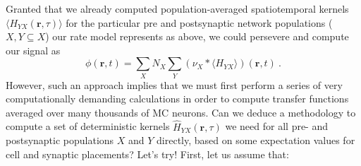 Granted that we already computed population-averaged spatiotemporal kernels $\langle H_{YX} (\mathbf{r}, \tau) \rangle$ for the particular pre and postsynaptic network populations ($X, Y \subseteq X$) our rate model represents as above,
we could persevere and compute our signal as
\begin{equation}
\phi(\mathbf{r}, t) = \sum_X N_X \sum_Y \left( \nu_X \ast \langle H_{YX} \rangle \right)(\mathbf{r}, t) ~.
\end{equation}
However, such an approach implies that we must first perform a series of very computationally demanding calculations
in order to compute transfer functions averaged over many thousands of MC neurons.
Can we deduce a methodology to compute a set of deterministic kernels $\hat{H}_{YX}(\mathbf{r}, \tau)$ we need for all pre- and postsynaptic populations $X$ and $Y$ directly,
based on some expectation values for cell and synaptic placements?
Let's try!
First, let us assume that:
